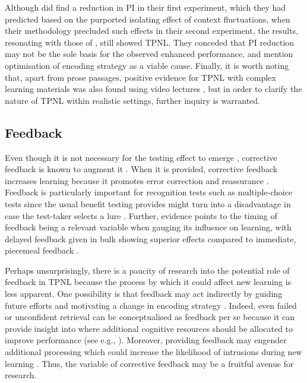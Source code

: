 \documentclass[../main.tex]{subfiles}
\begin{document}
Although \cite{divisRetrievalSpeedsContext2014} did find a reduction in PI 
in their first experiment, which they had predicted based on the purported 
isolating effect of context fluctuations, when their methodology precluded 
such effects in their second experiment, the results, resonating with those 
of \cite{wissmanInterimTestEffect2011}, still showed TPNL. They conceded 
that PI reduction may not be the sole basis for the observed enhanced 
performance, and mention optimisation of encoding strategy as a viable 
cause. Finally, it is worth noting that, apart from prose passages, positive 
evidence for TPNL with complex learning materials was also found using video 
lectures \citep{szpunarInterpolatedMemoryTests2013, 
	jingInterpolatedTestingInfluences2016}, but in order to clarify the
nature of TPNL within realistic settings, further inquiry is warranted.

\hypertarget{feedback}{%
\subsection{Feedback}}

Even though it is not necessary for the testing effect to emerge 
\citep{roedigeriiiTestEnhancedLearningTaking2006}, corrective feedback is 
known to augment it \citep{roedigeriiiCriticalRoleRetrieval2011}. When it is 
provided, corrective feedback increases learning because it promotes error 
correction \citep{pashlerWhenDoesFeedback2005} and reassurance 
\citep{butlerCorrectingMetacognitiveError2008}. Feedback is particularly 
important for recognition tests such as multiple-choice tests since the 
usual benefit testing provides might turn into a disadvantage in case the 
test-taker selects a lure 
\citep{roedigeriiiPositiveNegativeConsequences2005, 
	marshMemorialConsequencesMultiplechoice2007}. Further, evidence points 
	to the timing of feedback being a relevant variable when gauging its 
	influence on learning, with delayed feedback given in bulk showing 
	superior effects compared to immediate, piecemeal feedback 
\citep{metcalfeDelayedImmediateFeedback2009,butlerEffectTypeTiming2007, 
	butlerFeedbackEnhancesPositive2008,smithLearningFeedbackSpacing2010}.

Perhaps unsurprisingly, there is a paucity of research into the potential 
role of feedback in TPNL because the process by which it could affect new 
learning is less apparent. One possibility is that feedback may act 
indirectly by guiding future efforts and motivating a change in encoding 
strategy \citep{roedigeriiiPowerTestingMemory2006}. Indeed, even failed or 
unconfident retrieval can be conceptualised as feedback per se because it 
can provide insight into where additional cognitive resources should be 
allocated to improve performance (see e.g., 
\citealp{kornellUnsuccessfulRetrievalAttempts2009}). Moreover, providing 
feedback may engender additional processing 
\citep{bangert-drownsInstructionalEffectFeedback1991} which could increase 
the likelihood of intrusions during new learning 
\citep{chanRetrievalPotentiatesNew2018}. Thus, the variable of corrective 
feedback may be a fruitful avenue for research.
\end{document}
